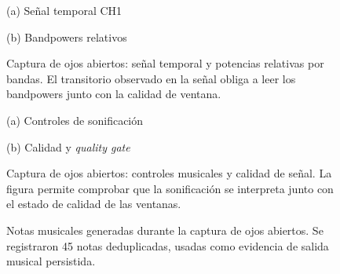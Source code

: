 \begin{figure}[htbp]
    \centering
    \begin{minipage}{0.49\textwidth}
        \centering
        \small (a) Señal temporal CH1
    \end{minipage}
    \hfill
    \begin{minipage}{0.49\textwidth}
        \centering
        \small (b) Bandpowers relativos
    \end{minipage}
    \caption{Captura de ojos abiertos: señal temporal y potencias relativas por bandas. El transitorio observado en la señal obliga a leer los bandpowers junto con la calidad de ventana.}
    \label{fig:validacion_s01_01_eeg_bands}
\end{figure}

\begin{figure}[htbp]
    \centering
    \begin{minipage}{0.49\textwidth}
        \centering
        \small (a) Controles de sonificación
    \end{minipage}
    \hfill
    \begin{minipage}{0.49\textwidth}
        \centering
        \small (b) Calidad y \textit{quality gate}
    \end{minipage}
    \caption{Captura de ojos abiertos: controles musicales y calidad de señal. La figura permite comprobar que la sonificación se interpreta junto con el estado de calidad de las ventanas.}
    \label{fig:validacion_s01_01_controls_quality}
\end{figure}

\begin{figure}[htbp]
    \centering
    \caption{Notas musicales generadas durante la captura de ojos abiertos. Se registraron 45 notas deduplicadas, usadas como evidencia de salida musical persistida.}
    \label{fig:validacion_s01_01_notes}
\end{figure}


